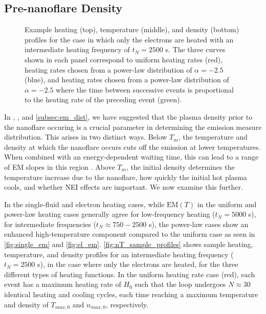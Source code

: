 \documentclass[preprint,linenumbers]{aastex}
\begin{document}
	\subsection{Pre-nanoflare Density}
	\label{subsec:pre_nanoflare_density}
	\begin{figure*}
		\caption{Example heating (top), temperature (middle), and density (bottom) profiles for the case in which only the electrons are heated with an intermediate heating frequency of $t_N=2500$ s. The three curves shown in each panel correspond to uniform heating rates (red), heating rates chosen from a power-law distribution of $\alpha=-2.5$ (blue), and heating rates chosen from a power-law distribution of $\alpha=-2.5$ where the time between successive events is proportional to the heating rate of the preceding event (green).}
		\label{fig:nT_sample_profiles}
	\end{figure*}
	\par In \citet{cargill_active_2014}, , and \autoref{subsec:em_dist}, we have suggested that the plasma density prior to the nanoflare occuring is a crucial parameter in determining the emission measure distribution. This arises in two distinct ways. Below $T_m$, the temperature and density at which the nanoflare occurs cuts off the emission at lower temperatures. When combined with an energy-dependent waiting time, this can lead to a range of EM slopes in this region \citep{cargill_active_2014}. Above $T_m$, the initial density determines the temperature increase due to the nanoflare, how quickly the initial hot plasma cools, and whether NEI effects are important. We now examine this further.
	\par In the single-fluid and electron heating cases, while $\mathrm{EM}(T)$ in the uniform and power-law heating cases generally agree for low-frequency heating ($t_N=5000$ s), for intermediate frequencies ($t_N\approx750-2500$ s), the power-law cases show an enhanced high-temperature component compared to the uniform case as seen in \autoref{fig:single_em} and \autoref{fig:el_em}. \autoref{fig:nT_sample_profiles} shows sample heating, temperature, and density profiles for an intermediate heating frequency ($t_N=2500$ s), in the case where only the electrons are heated, for the three different types of heating functions. In the uniform heating rate case (red), each event has a maximum heating rate of $H_0$ such that the loop undergoes $N\approx30$ identical heating and cooling cycles, each time reaching a maximum temperature and density of $T_{max,0}$ and $n_{max,0}$, respectively. 
\end{document}
